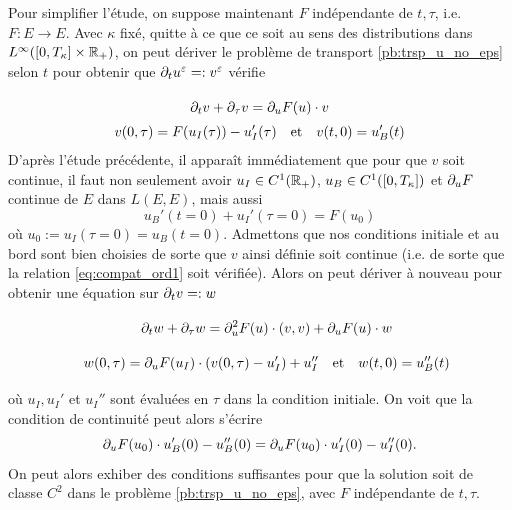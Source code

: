 Pour simplifier l'étude, on suppose maintenant $F$ indépendante de $t,\tau$, i.e. $F:E\rightarrow E$. 
Avec $\kappa$ fixé, quitte à ce que ce soit au sens des distributions dans $L^{\infty}([0,T_{\kappa}]\times\mathbb{R}_+)$, on peut dériver le problème de transport \eqref{pb:trsp_u_no_eps} selon $t$ pour obtenir que $\partial_t u^{\varepsilon} =: v^{\varepsilon}$ vérifie 
\begin{equation} 
\begin{array}{c}
\displaystyle
\partial_t v + \partial_{\tau} v = \partial_{u} F(u)\cdot v \vphantom{\int_0^1}
\\ \displaystyle
v(0,\tau) = F(u_I(\tau)) - u_I'(\tau) \quad \text{et} \quad v(t,0) = u_B'(t)
\end{array}
\label{pb:trsp_v_no_eps}
\end{equation}
D'après l'étude précédente, il apparaît immédiatement que pour que $v$ soit continue, il faut non seulement avoir $u_I\in C^1(\mathbb{R}_+)$, $u_B\in C^1([0,T_{\kappa}])$  
et $\partial_{u} F$ continue de $E$ dans $L(E,E)$, mais aussi 
\begin{equation}
u_B'(t=0) + u_I'(\tau = 0) = F(u_0)
\label{eq:compat_ord1}
\end{equation}
où $u_0 := u_I(\tau = 0) = u_B(t = 0)$. 
Admettons que nos conditions initiale et au bord sont bien choisies de sorte que $v$ ainsi définie soit continue (i.e. de sorte que la relation \eqref{eq:compat_ord1} soit vérifiée). 
Alors on peut dériver à nouveau pour obtenir une équation sur $\partial_t v =: w$ 
\begin{equation} \label{pb:trsp_w_no_eps}
\begin{array}{lc}
&\displaystyle
\dpt w + \dptau w = %
\dpu^2 F(u)\cdot (v,v) + \dpu F(u)\cdot w \vphantom{\int_0^1}
\\ & \displaystyle
w(0,\tau) = %
\dpu F(u_I)\cdot (v(0,\tau) - u_I') %
+ u_I'' \vphantom{\int_0^1} 
\quad %
\text{et} \quad w(t,0) = u_B''(t)
\end{array}
\end{equation}
où %
$u_I,u_I'$ et $u_I''$ sont évaluées en $\tau$ dans la condition initiale. On voit que la condition de continuité peut alors s'écrire 
\begin{equation} \label{eq:compat_ord2} 
\dpu F(u_0)\cdot u_B'(0) - u_B''(0) = %
\dpu F(u_0)\cdot u_I'(0) - u_I''(0). 
\end{equation}
On peut alors exhiber des conditions suffisantes pour que la solution soit de classe $C^2$ dans le problème \eqref{pb:trsp_u_no_eps}, avec $F$ indépendante de $t,\tau$. \\


